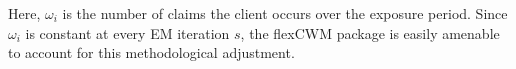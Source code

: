 \documentclass[11pt,letterpaper]{article}
\numberwithin{equation}{section}
\numberwithin{equation}{section}
\numberwithin{equation}{section}
\begin{document}
Here, $\mathcal{\omega}_i$ is the number of claims the client occurs over the exposure period. Since $\mathcal{\omega}_i$ is constant at every EM iteration $s$, the flexCWM package is easily amenable to account for this methodological adjustment.

\end{document}
